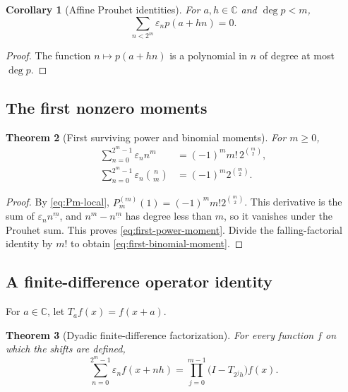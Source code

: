 \documentclass[11pt,oneside]{article}
\newtheorem{theorem}{Theorem}[section]
\newtheorem{corollary}[theorem]{Corollary}
\theoremstyle{definition}
\theoremstyle{remark}
\newcommand{\C}{\mathbb C}
\newcommand{\eps}{\varepsilon}
\newcommand{\fall}[2]{#1^{\underline{#2}}}
\newcommand{\1}{\mathbf 1}
\begin{document}
\begin{corollary}[Affine Prouhet identities]
\label{cor:affine-prouhet}
For \(a,h\in\C\) and \(\deg p<m\),
\begin{equation}
 \sum_{n<2^m}\eps_np(a+hn)=0.
 \label{eq:affine-prouhet}
\end{equation}
\end{corollary}

\begin{proof}
The function \(n\mapsto p(a+hn)\) is a polynomial in \(n\) of degree at most \(\deg p\).
\end{proof}

\subsection{The first nonzero moments}

\begin{theorem}[First surviving power and binomial moments]
\label{thm:first-moment}
For \(m\ge0\),
\begin{align}
 \sum_{n=0}^{2^m-1}\eps_n n^m
 &=(-1)^m m!\,2^{\binom m2},                              \label{eq:first-power-moment}\\
 \sum_{n=0}^{2^m-1}\eps_n\binom nm
 &=(-1)^m2^{\binom m2}.                                   \label{eq:first-binomial-moment}
\end{align}
\end{theorem}

\begin{proof}
By \eqref{eq:Pm-local},
\(P_m^{(m)}(1)=(-1)^m m!2^{\binom m2}\).  This derivative is the sum of
\(\eps_n\fall nm\), and \(n^m-\fall nm\) has degree less than \(m\), so it vanishes under the
Prouhet sum.  This proves \eqref{eq:first-power-moment}.  Divide the falling-factorial identity
by \(m!\) to obtain \eqref{eq:first-binomial-moment}.
\end{proof}

\subsection{A finite-difference operator identity}

For \(a\in\C\), let \(T_a f(x)=f(x+a)\).

\begin{theorem}[Dyadic finite-difference factorization]
\label{thm:operator}
For every function \(f\) on which the shifts are defined,
\begin{equation}
 \boxed{
 \sum_{n=0}^{2^m-1}\eps_n f(x+nh)
 =\prod_{j=0}^{m-1}\bigl(I-T_{2^jh}\bigr)f(x).}
 \label{eq:operator-factor}
\end{equation}
\end{theorem}
\end{document}
